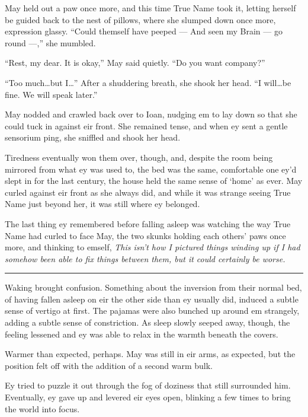 May held out a paw once more, and this time True Name took it, letting herself be guided back to the nest of pillows, where she slumped down once more, expression glassy. ``Could themself have peeped — And seen my Brain — go round —,'' she mumbled.

``Rest, my dear. It is okay,'' May said quietly. ``Do you want company?''

``Too much\ldots but I\ldots{}'' After a shuddering breath, she shook her head. ``I will\ldots be fine. We will speak later.''

May nodded and crawled back over to Ioan, nudging em to lay down so that she could tuck in against eir front. She remained tense, and when ey sent a gentle sensorium ping, she sniffled and shook her head.

Tiredness eventually won them over, though, and, despite the room being mirrored from what ey was used to, the bed was the same, comfortable one ey'd slept in for the last century, the house held the same sense of `home' as ever. May curled against eir front as she always did, and while it was strange seeing True Name just beyond her, it was still where ey belonged.

The last thing ey remembered before falling asleep was watching the way True Name had curled to face May, the two skunks holding each others' paws once more, and thinking to emself, \emph{This isn't how I pictured things winding up if I had somehow been able to fix things between them, but it could certainly be worse.}

\begin{center}\rule{0.5\linewidth}{0.5pt}\end{center}

Waking brought confusion. Something about the inversion from their normal bed, of having fallen asleep on eir the other side than ey usually did, induced a subtle sense of vertigo at first. The pajamas were also bunched up around em strangely, adding a subtle sense of constriction. As sleep slowly seeped away, though, the feeling lessened and ey was able to relax in the warmth beneath the covers.

Warmer than expected, perhaps. May was still in eir arms, as expected, but the position felt off with the addition of a second warm bulk.

Ey tried to puzzle it out through the fog of doziness that still surrounded him. Eventually, ey gave up and levered eir eyes open, blinking a few times to bring the world into focus.

